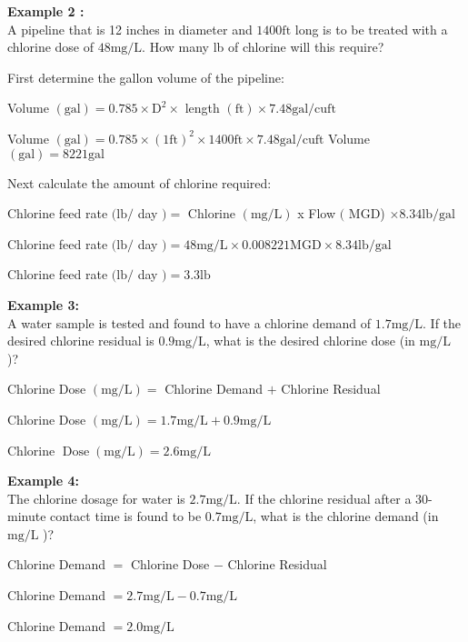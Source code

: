 \textbf{Example 2 :}\\
A pipeline that is 12 inches in diameter and $1400 \mathrm{ft}$ long is to be treated with a chlorine dose of $48 \mathrm{mg} / \mathrm{L}$. How many lb of chlorine will this require?

First determine the gallon volume of the pipeline:

Volume $(\mathrm{gal})=0.785 \times \mathrm{D}^{2} \times$ length $(\mathrm{ft}) \times 7.48 \mathrm{gal} / \mathrm{cu} \mathrm{ft}$

Volume $(\mathrm{gal})=0.785 \times(1 \mathrm{ft})^{2} \times 1400 \mathrm{ft} \times 7.48 \mathrm{gal} / \mathrm{cu} \mathrm{ft}$ Volume $(\mathrm{gal})=8221 \mathrm{gal}$

Next calculate the amount of chlorine required:

Chlorine feed rate $(\mathrm{lb} /$ day $)=$ Chlorine $(\mathrm{mg} / \mathrm{L})$ x Flow $($ MGD) $\times 8.34 \mathrm{lb} / \mathrm{gal}$

Chlorine feed rate $(\mathrm{lb} /$ day $)=48 \mathrm{mg} / \mathrm{L} \times 0.008221 \mathrm{MGD} \times 8.34 \mathrm{lb} / \mathrm{gal}$

Chlorine feed rate $(\mathrm{lb} /$ day $)=3.3 \mathrm{lb}$

\textbf{Example 3:}\\
A water sample is tested and found to have a chlorine demand of $1.7 \mathrm{mg} / \mathrm{L}$. If the desired chlorine residual is $0.9 \mathrm{mg} / \mathrm{L}$, what is the desired chlorine dose (in $\mathrm{mg} / \mathrm{L}$ )?

Chlorine Dose $(\mathrm{mg} / \mathrm{L})=$ Chlorine Demand $+$ Chlorine Residual

Chlorine Dose $(\mathrm{mg} / \mathrm{L})=1.7 \mathrm{mg} / \mathrm{L}+0.9 \mathrm{mg} / \mathrm{L}$

Chlorine $\operatorname{Dose}(\mathrm{mg} / \mathrm{L})=2.6 \mathrm{mg} / \mathrm{L}$

\textbf{Example 4:}\\
The chlorine dosage for water is $2.7 \mathrm{mg} / \mathrm{L}$. If the chlorine residual after a 30-minute contact time is found to be $0.7 \mathrm{mg} / \mathrm{L}$, what is the chlorine demand (in $\mathrm{mg} / \mathrm{L}$ )?

Chlorine Demand $=$ Chlorine Dose $-$ Chlorine Residual

Chlorine Demand $=2.7 \mathrm{mg} / \mathrm{L}-0.7 \mathrm{mg} / \mathrm{L}$

Chlorine Demand $=2.0 \mathrm{mg} / \mathrm{L}$

